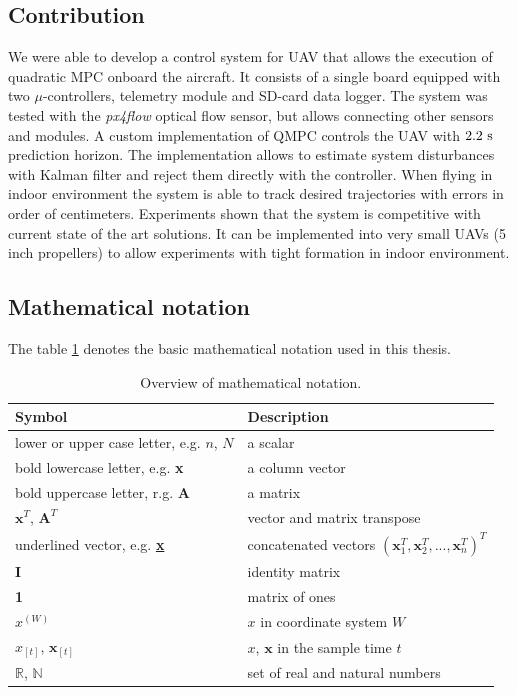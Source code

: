 \subsection{Contribution}

We were able to develop a control system for UAV that allows the execution of quadratic MPC onboard the aircraft. It consists of a single board equipped with two $\mu$-controllers, telemetry module and SD-card data logger. The system was tested with the \textit{px4flow} optical flow sensor, but allows connecting other sensors and modules. A custom implementation of QMPC controls the UAV with $2.2~\mathrm{s}$ prediction horizon. The implementation allows to estimate system disturbances with Kalman filter and reject them directly with the controller. When flying in indoor environment the system is able to track desired trajectories with errors in order of centimeters. Experiments shown that the system is competitive with current state of the art solutions. It can be implemented into very small UAVs (5 inch propellers) to allow experiments with tight formation in indoor environment.

\subsection{Mathematical notation}

The table \ref{tab:notation} denotes the basic mathematical notation used in this thesis.

\begin{table}[h]
\centering
\begin{tabular}{ll}
\hline
Symbol & Description \\
\hline
lower or upper case letter, e.g. $n$, $N$ & a scalar \\
bold lowercase letter, e.g. \textbf{x} & a column vector \\ 
bold uppercase letter, r.g. \textbf{A} & a matrix \\
$\textbf{x}^T$, $\textbf{A}^T$ & vector and matrix transpose \\
underlined vector, e.g. \textbf{\underline{x}} & concatenated vectors $\left(\textbf{x}_1^T,\textbf{x}_2^T,...,\textbf{x}_n^T\right)^T$ \\
\textbf{I} & identity matrix \\
\textbf{1} & matrix of ones \\
$x^{(W)}$ & $x$ in coordinate system $W$ \\ 
$x_{[t]}$, $\textbf{x}_{[t]}$ & $x$, $\textbf{x}$ in the sample time $t$ \\
$\mathbb{R}$, $\mathbb{N}$ & set of real and natural numbers \\
\hline
\end{tabular}
\caption{Overview of mathematical notation.}
\label{tab:notation}
\end{table}

